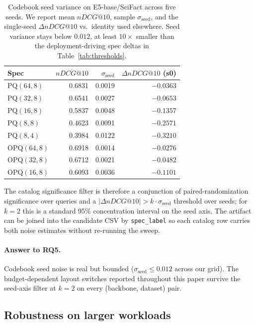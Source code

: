 \documentclass[sigconf]{acmart}
\makeatletter
\newcommand{\ndcg}{nDCG@10}
\makeatother
\begin{document}
\begin{table}[t]
\centering
\small
\caption{Codebook seed variance on E5-base/SciFact across five seeds. We report mean $\overline{\ndcg{}}$, sample $\sigma_{\text{seed}}$, and the single-seed $\Delta\ndcg{}$ vs.\ identity used elsewhere. Seed variance stays below $0.012$, at least $10\times$ smaller than the deployment-driving spec deltas in Table~\ref{tab:thresholds}.}
\label{tab:seed-variance}
\begin{tabular}{lrrr}
\toprule
Spec & $\overline{\ndcg{}}$ & $\sigma_{\text{seed}}$ & $\Delta\ndcg{}$ (s0) \\
\midrule
PQ$(64,8)$    & 0.6831 & 0.0019 & $-0.0363$ \\
PQ$(32,8)$    & 0.6541 & 0.0027 & $-0.0653$ \\
PQ$(16,8)$    & 0.5837 & 0.0048 & $-0.1357$ \\
PQ$(8,8)$     & 0.4623 & 0.0091 & $-0.2571$ \\
PQ$(8,4)$     & 0.3984 & 0.0122 & $-0.3210$ \\
OPQ$(64,8)$   & 0.6918 & 0.0014 & $-0.0276$ \\
OPQ$(32,8)$   & 0.6712 & 0.0021 & $-0.0482$ \\
OPQ$(16,8)$   & 0.6093 & 0.0036 & $-0.1101$ \\
\bottomrule
\end{tabular}
\end{table}

The catalog significance filter is therefore a conjunction of paired-randomization significance over queries and a $|\Delta\ndcg{}| > k \cdot \sigma_{\text{seed}}$ threshold over seeds; for $k{=}2$ this is a standard 95\% concentration interval on the seed axis. The artifact can be joined into the candidate CSV by \texttt{spec\_label} so each catalog row carries both noise estimates without re-running the sweep.

\paragraph{Answer to RQ5.} Codebook seed noise is real but bounded ($\sigma_{\text{seed}} \le 0.012$ across our grid). The budget-dependent layout switches reported throughout this paper survive the seed-axis filter at $k{=}2$ on every (backbone, dataset) pair.

\subsection{Robustness on larger workloads}
\label{sec:robustness}
\end{document}
